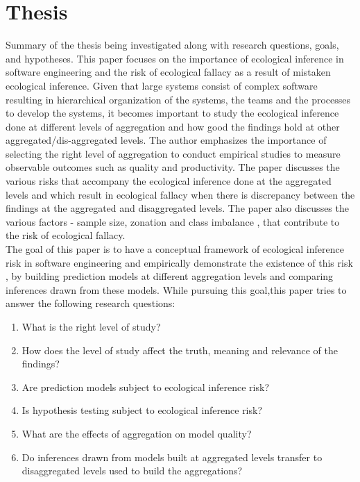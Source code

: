 \documentclass{acm_proc_article-sp}
\begin{document}
\section{Thesis}
\label{thesis}
	Summary of the thesis being investigated along with research questions, goals, and hypotheses.
This paper focuses on the importance of ecological inference in software engineering and the risk of ecological fallacy as a result of mistaken ecological inference. Given that large systems consist of complex software
resulting in hierarchical organization of the systems, the teams and the processes to develop the systems, it becomes important to study the ecological inference
done at different levels of aggregation and how good the findings hold at other aggregated/dis-aggregated levels. The author emphasizes the importance of selecting the 
right level of aggregation to conduct empirical studies to measure observable outcomes such as quality and productivity. The paper discusses the various risks that accompany the 
ecological inference done at the aggregated levels and which result in ecological fallacy when there is discrepancy between the findings at the aggregated and disaggregated levels. The
paper also discusses the various factors - sample size, zonation and class imbalance , that contribute to the risk of ecological fallacy. \\
	The goal of this paper is to have a conceptual framework of ecological inference risk in software engineering and empirically demonstrate the existence of this risk , by building
  prediction models at different aggregation levels and comparing inferences drawn from these models. While pursuing this goal,this paper tries to answer the following research questions:
\begin{enumerate}
  \item What is the right level of study?
  \item How does the level of study affect the truth, meaning and relevance of the findings?
  \item Are prediction models subject to ecological inference risk?
  \item Is hypothesis testing subject to ecological inference risk?
  \item What are the effects of aggregation on model quality?
  \item Do inferences drawn from models built at aggregated levels transfer to disaggregated levels used to build the aggregations?
\end{enumerate}
\end{document}
